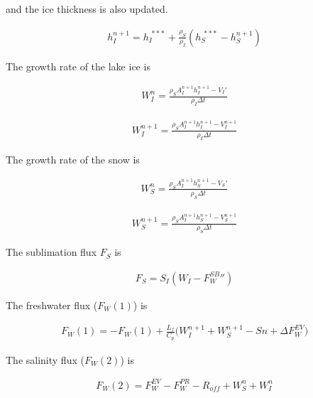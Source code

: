and the ice thickness is also updated.

\begin{eqnarray}
    h_I^{n+1} = h_I^{\ *** } + \frac{\rho_S}{\rho_I} (h_S^{\ *** }-h_S^{n+1})
\end{eqnarray}

The growth rate of the lake ice is

\begin{eqnarray}
    W_I^n = \frac{\rho_S A_I^{n+1}h_I^{n+1} - V_I'}{\rho_I \Delta t}
\end{eqnarray}

\begin{eqnarray}
    W_I^{n+1} = \frac{\rho_S A_I^{n+1}h_I^{n+1} - V_I^{n+1}}{\rho_I \Delta t}
\end{eqnarray}

The growth rate of the snow is

\begin{eqnarray}
    W_S^n =  \frac{\rho_S A_I^{n+1}h_S^{n+1} - V_S'}{\rho_S \Delta t}
\end{eqnarray}

\begin{eqnarray}
    W_S^{n+1} =  \frac{\rho_S A_I^{n+1}h_S^{n+1} - V_S^{n+1}}{\rho_S \Delta t}
\end{eqnarray}

The sublimation flux \(F_S\) is

\begin{eqnarray}
    F_S = S_I(W_I-F_W^{SB}{''})
\end{eqnarray}

The freshwater flux (\(F_W(1)\)) is

\begin{eqnarray}
    F_W(1) = - F_W(1) + \frac{L_f}{C_p} \Big(W_I^{n+1}+W_S^{n+1}-Sn + \Delta F_W^{EV}\Big)
\end{eqnarray}

The salinity flux (\(F_W(2)\)) is

\begin{eqnarray}
    F_W(2) =F_W^{EV} - F_W^{PR} - R_{off} + W_S^n + W_I^n
\end{eqnarray}
